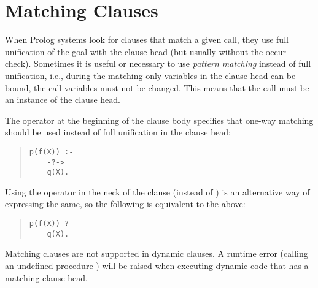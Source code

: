\section{Matching Clauses}
\label{matching}
When Prolog systems look for clauses that match a given call,
they use full unification of the goal with the clause head
(but usually without the occur check).
Sometimes it is useful or necessary to use {\it pattern matching}
instead of full unification, i.e., during the matching
only variables in the clause head can be bound, the call
variables must not be changed.
This means that the call must be an instance of the
clause head.

The operator  at the beginning of the clause
body specifies that one-way matching should be used
instead of full unification in the clause head:
\begin{quote}
\begin{verbatim}
p(f(X)) :-
    -?->
    q(X).
\end{verbatim}
\end{quote}
Using the  operator in the neck of the clause (instead of
\notationidx{:-}) is an alternative way of expressing the same, so the following
is equivalent to the above:
\begin{quote}
\begin{verbatim}
p(f(X)) ?-
    q(X).
\end{verbatim}
\end{quote}

Matching clauses are not supported in dynamic clauses. A runtime error
(calling an undefined procedure ) will be raised
when
executing dynamic code that has a matching clause head.


